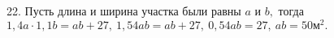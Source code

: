 22. Пусть длина и ширина участка были равны $a$ и $b,$ тогда $1,4a\cdot1,1b=ab+27,\ 1,54ab=ab+27,\ 0,54ab=27,\ ab=50\text{м}^2.$\\
